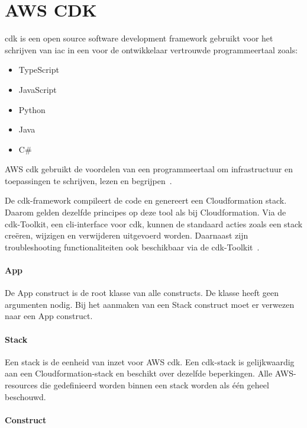 \section{AWS CDK}
\label{subsec:service-cdk}

\acrfull{cdk} is een open source software development framework gebruikt voor het schrijven van \acrfull{iac} in een voor de ontwikkelaar vertrouwde programmeertaal zoals:

\begin{itemize}
    \item TypeScript
    \item JavaScript
    \item Python
    \item Java
    \item C\#
\end{itemize}

AWS \acrshort{cdk} gebruikt de voordelen van een programmeertaal om infrastructuur en toepassingen te schrijven, lezen en begrijpen~\autocite{Mansoor2014}.

De \acrshort{cdk}-framework compileert de code en genereert een Cloudformation stack.
Daarom gelden dezelfde principes op deze tool als bij Cloudformation.
Via de \acrshort{cdk}-Toolkit, een \acrshort{cli}-interface voor \acrshort{cdk}, kunnen de standaard acties zoals een stack creëren, wijzigen en verwijderen uitgevoerd worden.
Daarnaast zijn troubleshooting functionaliteiten ook beschikbaar via de \acrshort{cdk}-Toolkit~\autocite{Mansoor2014}.

\paragraph{App}

De App construct is de root klasse van alle constructs.
De klasse heeft geen argumenten nodig.
Bij het aanmaken van een Stack construct moet er verwezen naar een App construct.

\paragraph{Stack}

Een stack is de eenheid van inzet voor AWS \acrshort{cdk}.
Een \acrshort{cdk}-stack is gelijkwaardig aan een Cloudformation-stack en beschikt over dezelfde beperkingen.
Alle AWS-resources die gedefinieerd worden binnen een stack worden als één geheel beschouwd.

\paragraph{Construct}

